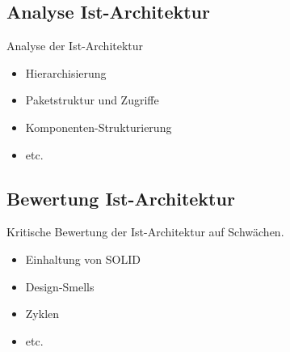 


\subsection{Analyse Ist-Architektur}
Analyse der Ist-Architektur
\begin{itemize}
\item Hi­e­r­ar­chi­sie­rung
\item Paketstruktur und Zugriffe
\item Komponenten-Strukturierung
\item etc.
\end{itemize}

\subsection{Bewertung Ist-Architektur}
Kritische Bewertung der Ist-Architektur auf Schwächen.
\begin{itemize}
\item Einhaltung von SOLID
\item Design-Smells
\item Zyklen
\item etc.
\end{itemize}
